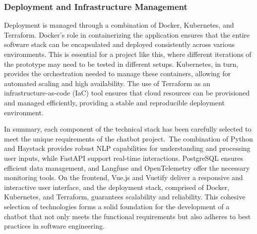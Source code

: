 \subsubsection{Deployment and Infrastructure Management}

Deployment is managed through a combination of Docker, Kubernetes, and Terraform.
Docker’s role in containerizing the application ensures that the entire software stack can be encapsulated and deployed
consistently across various environments.\autocite[cf.][p. 191]{openjaStudyingPracticesDeploying2022} This is essential
for a project like this, where different iterations of the prototype may need to be tested in different setups.
Kubernetes, in turn, provides the orchestration needed to manage these containers, allowing for automated scaling and
high availability.\autocite[cf.][pp. 2,7-8]{carrionKubernetesSchedulingTaxonomy2022} The use of Terraform as an
infrastructure-as-code (\ac{IaC}) tool ensures that cloud resources can be provisioned and managed efficiently, providing a
stable and reproducible deployment environment.\autocite[cf.][p. 24]{n.EvaluatingDevopsTools2023}

\vspace{1cm}

In summary, each component of the technical stack has been carefully selected to meet the unique requirements of the
chatbot project.\ The combination of Python and Haystack provides robust NLP capabilities for understanding and
processing user inputs, while FastAPI support real-time interactions. PostgreSQL ensures efficient data management,
and Langfuse and OpenTelemetry offer the necessary monitoring tools. On the frontend, Vue.js and Vuetify deliver a
responsive and interactive user interface, and the deployment stack, comprised of Docker, Kubernetes, and Terraform,
guarantees scalability and reliability. This cohesive selection of technologies forms a solid foundation for the
development of a chatbot that not only meets the functional requirements but also adheres to best practices in software
engineering.
